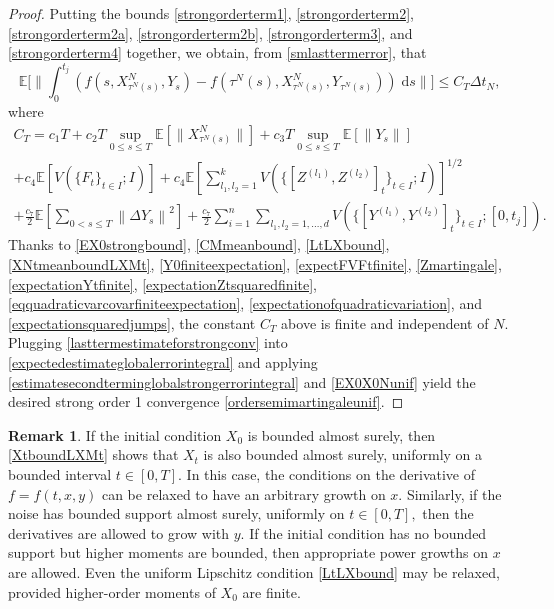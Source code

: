 \documentclass[reqno,12pt]{amsart}
\theoremstyle{plain} %
\theoremstyle{definition} %
\newtheorem{remark}{Remark}[section]
\begin{document}
\begin{proof}
    Putting the bounds \cref{strongorderterm1}, \cref{strongorderterm2}, \cref{strongorderterm2a}, \cref{strongorderterm2b}, \cref{strongorderterm3}, and \cref{strongorderterm4} together, we obtain, from \cref{smlasttermerror}, that
    \begin{equation}
        \label{lasttermestimateforstrongconv}
        \mathbb{E}\bigg[\bigg\| \int_0^{t_j} \left( f(s, X_{\tau^N(s)}^N, Y_s) - f(\tau^N(s), X_{\tau^N(s)}^N, Y_{\tau^N(s)}) \right)\;\mathrm{d}s \bigg\|\bigg] \leq C_T \Delta t_N,
    \end{equation}
    where
    \begin{multline*}
            C_T = c_1 T + c_2T\sup_{0\leq s \leq T} \mathbb{E}\left[\|X_{\tau^N(s)}^N\|\right] + c_3T\sup_{0 \leq s \leq T}\mathbb{E}\left[\|Y_s\|\right] \\
            + c_4\mathbb{E}\left[ V(\{F_t\}_{t\in I}; I) \right] + c_4\mathbb{E}\left[\sum_{l_1,l_2=1}^k V(\{[Z^{(l_1)}, Z^{(l_2)}]_t\}_{t\in I}; I)\right]^{1/2} \\
            + \frac{c_7}{2} \mathbb{E}\left[\sum_{0 < s \leq T}\left\| \Delta Y_s \right\|^2\right] + \frac{c_7}{2} \sum_{i=1}^n \sum_{l_1, l_2 = 1, \ldots, d} V(\{[Y^{(l_1)}, Y^{(l_2)}]_t\}_{t\in I}; [0, t_j]).
    \end{multline*}
    Thanks to \cref{EX0strongbound}, \cref{CMmeanbound}, \cref{LtLXbound}, \cref{XNtmeanboundLXMt}, \cref{Y0finiteexpectation}, \cref{expectFVFtfinite}, \cref{Zmartingale}, \cref{expectationYtfinite}, \cref{expectationZtsquaredfinite}, \cref{eqquadraticvarcovarfiniteexpectation}, \cref{expectationofquadraticvariation}, and \cref{expectationsquaredjumps}, the constant $C_T$ above is finite and independent of $N.$ Plugging \cref{lasttermestimateforstrongconv} into \cref{expectedestimateglobalerrorintegral} and applying \cref{estimatesecondterminglobalstrongerrorintegral} and \cref{EX0X0Nunif} yield the desired strong order 1 convergence \cref{ordersemimartingaleunif}.
\end{proof}

\begin{remark}
    If the initial condition $X_0$ is bounded almost surely, then \cref{XtboundLXMt} shows that $X_t$ is also bounded almost surely, uniformly on a bounded interval $t\in [0, T].$ In this case, the conditions on the derivative of $f=f(t, x, y)$ can be relaxed to have an arbitrary growth on $x$. Similarly, if the noise has bounded support almost surely, uniformly on $t\in [0, T],$ then the derivatives are allowed to grow with $y$. If the initial condition has no bounded support but higher moments are bounded, then appropriate power growths on $x$ are allowed. Even the uniform Lipschitz condition \cref{LtLXbound} may be relaxed, provided higher-order moments of $X_0$ are finite.
\end{remark}
\end{document}
